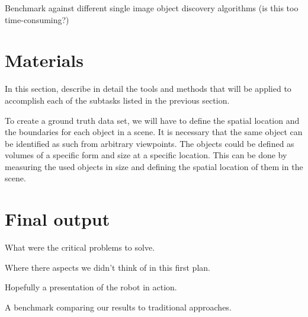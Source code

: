 \documentclass[a4paper,11pt,english]{article}
\begin{document}
Benchmark against different single image object discovery algorithms (is this too time-consuming?)

\section{Materials}
In this section, describe in detail the tools and methods that will be applied to accomplish each of the subtasks listed in the previous section.\medskip

To create a ground truth data set, we will have to define the spatial location and the boundaries for each object in a scene.
It is necessary that the same object can be identified as such from arbitrary viewpoints.
The objects could be defined as volumes of a specific form and size at a specific location. 
This can be done by measuring the used objects in size and defining the spatial location of them in the scene.


\section{Final output}
What were the critical problems to solve.

Where there aspects we didn't think of in this first plan.

Hopefully a presentation of the robot in action.

A benchmark comparing our results to traditional approaches. 


\newpage


\end{document}
